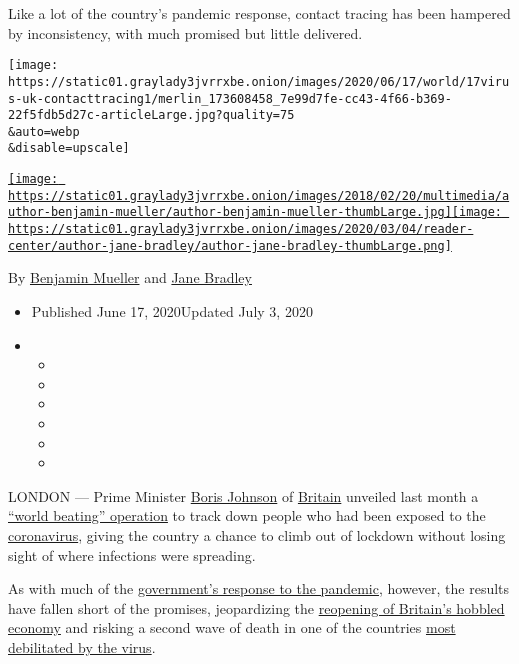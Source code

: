 Like a lot of the country's pandemic response, contact tracing has been
hampered by inconsistency, with much promised but little delivered.

\texttt{[image: https://static01.graylady3jvrrxbe.onion/images/2020/06/17/world/17virus-uk-contacttracing1/merlin\_173608458\_7e99d7fe-cc43-4f66-b369-22f5fdb5d27c-articleLarge.jpg?quality=75\\\&auto=webp\\\&disable=upscale]}

\href{https://www.nytimes3xbfgragh.onion/by/benjamin-mueller}{\texttt{[image: https://static01.graylady3jvrrxbe.onion/images/2018/02/20/multimedia/author-benjamin-mueller/author-benjamin-mueller-thumbLarge.jpg]}}\href{https://www.nytimes3xbfgragh.onion/by/jane-bradley}{\texttt{[image: https://static01.graylady3jvrrxbe.onion/images/2020/03/04/reader-center/author-jane-bradley/author-jane-bradley-thumbLarge.png]}}

By
\href{https://www.nytimes3xbfgragh.onion/by/benjamin-mueller}{Benjamin
Mueller} and
\href{https://www.nytimes3xbfgragh.onion/by/jane-bradley}{Jane Bradley}

\begin{itemize}
\item
  Published June 17, 2020Updated July 3, 2020
\item
  \begin{itemize}
  \item
  \item
  \item
  \item
  \item
  \item
  \end{itemize}
\end{itemize}

LONDON --- Prime Minister
\href{https://www.nytimes3xbfgragh.onion/2020/06/23/world/europe/uk-coronavirus-reopening.html}{Boris
Johnson} of
\href{https://www.nytimes3xbfgragh.onion/2020/06/23/world/europe/uk-coronavirus-reopening.html}{Britain}
unveiled last month a
\href{https://www.youtube.com/watch?v=VdlIVAwWmB8}{``world beating''
operation} to track down people who had been exposed to the
\href{https://www.nytimes3xbfgragh.onion/2020/06/23/world/europe/uk-coronavirus-reopening.html}{coronavirus},
giving the country a chance to climb out of lockdown without losing
sight of where infections were spreading.

As with much of the
\href{https://www.nytimes3xbfgragh.onion/2020/05/25/world/europe/coronavirus-uk-nursing-homes.html}{government's
response to the pandemic}, however, the results have fallen short of the
promises, jeopardizing the
\href{https://www.nytimes3xbfgragh.onion/2020/05/11/world/europe/coronavirus-uk-boris-johnson.html}{reopening
of Britain's hobbled economy} and risking a second wave of death in one
of the countries
\href{https://www.nytimes3xbfgragh.onion/interactive/2020/world/coronavirus-maps.html}{most
debilitated by the virus}.

